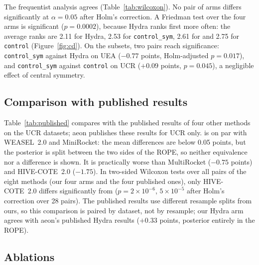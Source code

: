 The frequentist analysis agrees (Table~\ref{tab:wilcoxon}). No pair of arms differs
significantly at $\alpha=0.05$ after Holm's correction. A Friedman test over the four arms
is significant ($p=0.0002$), because Hydra ranks first more often: the average ranks are
2.11 for Hydra, 2.53 for \texttt{control\_sym}, 2.61 for \hh{} and 2.75 for
\texttt{control} (Figure~\ref{fig:cd}). On the subsets, two pairs reach significance:
\texttt{control\_sym} against Hydra on UEA ($-0.77$ points, Holm-adjusted $p=0.017$), and
\texttt{control\_sym} against \texttt{control} on UCR ($+0.09$ points, $p=0.045$), a
negligible effect of central symmetry.

\subsection{Comparison with published results}

\begin{table}[t]
\centering\small

\caption{\hh{} against aeon's published 30-resample results on the 112 UCR datasets
(dataset means). Bayesian signed-rank test, ROPE $\pm0.5$; \emph{practically worse}:
$P(\Delta<-0.5)\ge0.95$.}
\label{tab:published}
\end{table}

Table~\ref{tab:published} compares \hh{} with the published results of four other methods
on the UCR datasets; aeon publishes these results for UCR only. \hh{} is on par with
WEASEL~2.0 and MiniRocket: the mean differences are below 0.05 points, but the posterior
is split between the two sides of the ROPE, so neither equivalence nor a difference is
shown. It is practically worse than MultiRocket ($-0.75$ points) and HIVE-COTE~2.0
($-1.75$). In two-sided Wilcoxon tests over all pairs of the eight methods (our four arms
and the four published ones), only HIVE-COTE~2.0 differs significantly from \hh{} ($p=2\times
10^{-6}$, $5\times10^{-5}$ after Holm's correction over 28 pairs). The published results use
different resample splits from ours, so this comparison is paired by dataset, not by
resample; our Hydra arm agrees with aeon's published Hydra results ($+0.33$ points,
posterior entirely in the ROPE).

\subsection{Ablations}

\begin{table}[t]
\centering\small

\caption{Exploratory ablations of \hh{}, 30 resamples each. $\Delta$ against the default
configuration (mixed centring, at most 8 channels, soft-max and hard-max counts) and
against Hydra; $P$(rope) from the Bayesian signed-rank test against the default. The
\texttt{max\_channels} variants differ from the default only on the 7 datasets with
$C\ge18$.}
\label{tab:ablations}
\end{table}

